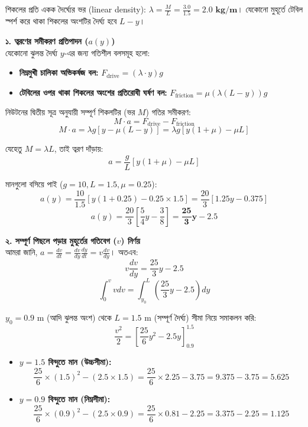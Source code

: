\documentclass[12pt, a4paper]{article}
\begin{document}
\begin{tcolorbox}[solutionbox={সমাধান (Solution)}]
\noindent
শিকলের প্রতি একক দৈর্ঘ্যের ভর (linear density): $\lambda = \frac{M}{L} = \frac{3.0}{1.5} = \mathbf{2.0\text{ kg/m}}$। 
যেকোনো মুহূর্তে টেবিল স্পর্শ করে থাকা শিকলের অংশটির দৈর্ঘ্য হবে $L - y$।

\vspace{0.5em}
\noindent
\textbf{১. ত্বরণের সমীকরণ প্রতিপাদন ($a(y)$)} \\
যেকোনো ঝুলন্ত দৈর্ঘ্য $y$-এর জন্য গতিশীল বলসমূহ হলো:
\begin{itemize}[leftmargin=*, parsep=0.4ex]
    \item \textbf{নিম্নমুখী চালিকা অভিকর্ষজ বল:} $F_{\text{drive}} = (\lambda \cdot y) g$
    \item \textbf{টেবিলের ওপর থাকা শিকলের অংশের প্রতিরোধী ঘর্ষণ বল:} $F_{\text{friction}} = \mu (\lambda(L - y)) g$
\end{itemize}

নিউটনের দ্বিতীয় সূত্র অনুযায়ী সম্পূর্ণ শিকলটির (ভর $M$) গতির সমীকরণ:
$$M \cdot a = F_{\text{drive}} - F_{\text{friction}}$$ 
$$M \cdot a = \lambda g \left[ y - \mu (L - y) \right] = \lambda g \left[ y (1 + \mu) - \mu L \right]$$

যেহেতু $M = \lambda L$, তাই ত্বরণ দাঁড়ায়:
$$a = \frac{g}{L} \left[ y (1 + \mu) - \mu L \right]$$

মানগুলো বসিয়ে পাই ($g = 10, L = 1.5, \mu = 0.25$):
$$a(y) = \frac{10}{1.5} \left[ y(1 + 0.25) - 0.25 \times 1.5 \right] = \frac{20}{3} \left[ 1.25 y - 0.375 \right]$$
$$a(y) = \frac{20}{3} \left[ \frac{5}{4} y - \frac{3}{8} \right] = \mathbf{\frac{25}{3} y - 2.5}$$

\vspace{0.5em}
\noindent
\textbf{২. সম্পূর্ণ পিছলে পড়ার মুহূর্তের গতিবেগ ($v$) নির্ণয়} \\
আমরা জানি, $a = \frac{dv}{dt} = \frac{dv}{dy} \frac{dy}{dt} = v \frac{dv}{dy}$। 
অতএব:
$$v \frac{dv}{dy} = \frac{25}{3} y - 2.5$$ 
$$\int_0^v v dv = \int_{y_0}^{L} \left( \frac{25}{3} y - 2.5 \right) dy$$

$y_0 = 0.9\text{ m}$ (আদি ঝুলন্ত অংশ) থেকে $L = 1.5\text{ m}$ (সম্পূর্ণ দৈর্ঘ্য) সীমা নিয়ে সমাকলন করি:
$$\frac{v^2}{2} = \left[ \frac{25}{6} y^2 - 2.5 y \right]_{0.9}^{1.5}$$

\begin{itemize}[leftmargin=*, parsep=0.4ex]
    \item \textbf{$y = 1.5$ বিন্দুতে মান (উচ্চসীমা):} 
    $$\frac{25}{6} \times (1.5)^2 - (2.5 \times 1.5) = \frac{25}{6} \times 2.25 - 3.75 = 9.375 - 3.75 = \mathbf{5.625}$$
    \item \textbf{$y = 0.9$ বিন্দুতে মান (নিম্নসীমা):} 
    $$\frac{25}{6} \times (0.9)^2 - (2.5 \times 0.9) = \frac{25}{6} \times 0.81 - 2.25 = 3.375 - 2.25 = \mathbf{1.125}$$
\end{itemize}


\end{tcolorbox}
\end{document}
